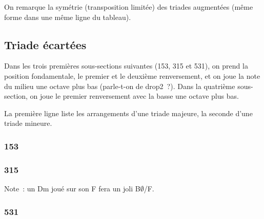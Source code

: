 \documentclass[11pt]{article}
\begin{document}
On remarque la symétrie (transposition limitée) des triades augmentées (même
forme dans une même ligne du tableau).

\subsection{Triade écartées}

Dans les trois premières sous-sections suivantes (153, 315 et 531), on prend
la position fondamentale, le premier et le deuxième renversement, et on joue la
note du milieu une octave plus bas (parle-t-on de drop2 ?). Dans la quatrième
sous-section, on joue le premier renversement avec la basse une octave plus
bas.

La première ligne liste les arrangements d’une triade majeure, la seconde d’une
triade mineure.

\subsubsection{153}



\subsubsection{315}



Note : un Dm joué sur son F fera un joli B$\emptyset$/F.

\subsubsection{531}


\end{document}

